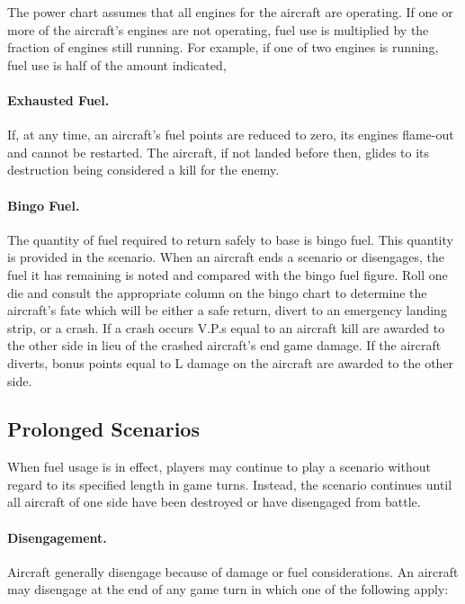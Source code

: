 The power chart assumes that all engines for the aircraft are operating. If one or more of the aircraft's engines are not operating, fuel use is multiplied by the fraction of engines still running. For example, if one of two engines is running, fuel use is half of the amount indicated,

\paragraph{Exhausted Fuel.} If, at any time, an aircraft's fuel points are reduced to zero, its engines flame-out and cannot be restarted. The aircraft, if not landed before then, glides to its destruction being considered a kill for the enemy.

\paragraph{Bingo Fuel.} The quantity of fuel required to return safely to base is bingo fuel. This quantity is provided in the scenario. When an aircraft ends a scenario or disengages, the fuel it has remaining is noted and compared with the bingo fuel figure. Roll one die and consult the appropriate column on the bingo chart to determine the aircraft's fate which will be either a safe return, divert to an emergency landing strip, or a crash. If a crash occurs V.P.s equal to an aircraft kill are awarded to the other side in lieu of the crashed aircraft's end game damage. If the aircraft diverts, bonus points equal to L damage on the aircraft are awarded to the other side.

\subsection{Prolonged Scenarios}

When fuel usage is in effect, players may continue to play a scenario without regard to its specified length in game turns. Instead, the scenario continues until all aircraft of one side have been destroyed or have disengaged from battle.

\paragraph{Disengagement.} Aircraft generally disengage because of damage or fuel considerations. An aircraft may disengage at the end of any game turn in which one of the following apply:

